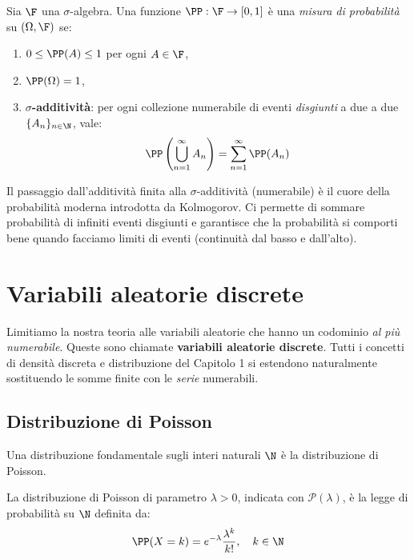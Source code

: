 \begin{definition}
Sia $\F$ una $\sigma$-algebra. Una funzione $\PP : \F \to [0, 1]$ è una \emph{misura di probabilità} su $(\Omega, \F)$ se:
\begin{enumerate}
    \item $0 \le \PP(A) \le 1$ per ogni $A \in \F$,
    \item $\PP(\Omega) = 1$,
    \item \textbf{$\sigma$-additività}: per ogni collezione numerabile di eventi \emph{disgiunti} a due a due $\{A_n\}_{n \in \N}$, vale:
    \[ \PP\left(\bigcup_{n=1}^\infty A_n\right) = \sum_{n=1}^\infty \PP(A_n) \]
\end{enumerate}
\end{definition}

\begin{spiegazione}
    Il passaggio dall'additività finita alla $\sigma$-additività (numerabile) è il cuore della probabilità moderna introdotta da Kolmogorov. Ci permette di sommare probabilità di infiniti eventi disgiunti e garantisce che la probabilità si comporti bene quando facciamo limiti di eventi (continuità dal basso e dall'alto).
\end{spiegazione}

\section{Variabili aleatorie discrete}

Limitiamo la nostra teoria alle variabili aleatorie che hanno un codominio \emph{al più numerabile}. Queste sono chiamate \textbf{variabili aleatorie discrete}. Tutti i concetti di densità discreta e distribuzione del Capitolo 1 si estendono naturalmente sostituendo le somme finite con le \emph{serie} numerabili.

\subsection{Distribuzione di Poisson}

Una distribuzione fondamentale sugli interi naturali $\N$ è la distribuzione di Poisson.

\begin{definition}
La distribuzione di Poisson di parametro $\lambda > 0$, indicata con $\mathcal{P}(\lambda)$, è la legge di probabilità su $\N$ definita da:
\[ \PP(X = k) = e^{-\lambda} \frac{\lambda^k}{k!}, \quad k \in \N \]
\end{definition}

